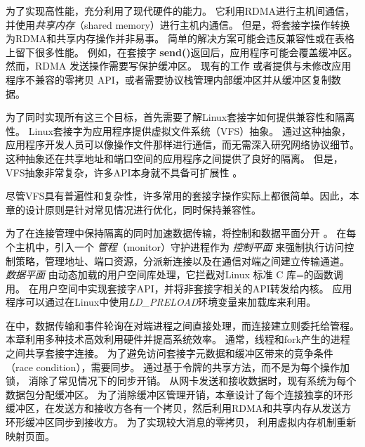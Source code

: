 为了实现高性能，\sys{}充分利用了现代硬件的能力。 它利用RDMA进行主机间通信，并使用\emph {共享内存}（shared memory）进行主机内通信。 但是，将套接字操作转换为RDMA和共享内存操作并非易事。
简单的解决方案可能会违反兼容性或在表格上留下很多性能。
例如，在套接字 \textbf {send()}返回后，应用程序可能会覆盖缓冲区。
然而，RDMA 发送操作需要写保护缓冲区。
现有的工作 \cite {rsockets} 或者提供与未修改应用程序不兼容的零拷贝 API，或者需要协议栈管理内部缓冲区并从缓冲区复制数据。

为了同时实现所有这三个目标，首先需要了解Linux套接字如何提供兼容性和隔离性。 Linux套接字为应用程序提供虚拟文件系统（VFS）抽象。 通过这种抽象，应用程序开发人员可以像操作文件那样进行通信，而无需深入研究网络协议细节。 这种抽象还在共享地址和端口空间的应用程序之间提供了良好的隔离。 但是，VFS抽象非常复杂，许多API本身就不具备可扩展性 \cite {clark1989analysis,boyd2010analysis,jeong2014mtcp}。

尽管VFS具有普遍性和复杂性，许多常用的套接字操作实际上都很简单。因此，本章的设计原则是针对常见情况进行优化，同时保持兼容性。

为了在连接管理中保持隔离的同时加速数据传输，\sys {}将控制和数据平面分开 \cite {peter2016arrakis}。
在每个主机中，引入一个 \emph {管程}（monitor）守护进程作为 \emph {控制平面} 来强制执行访问控制策略，管理地址、端口资源，分派新连接以及在通信对端之间建立传输通道。
\emph {数据平面} 由动态加载的用户空间库\libipc {}处理，它拦截对Linux 标准 C 库=的函数调用。 \libipc {}在用户空间中实现套接字API，并将非套接字相关的API转发给内核。
应用程序可以通过在Linux中使用\emph {LD\_PRELOAD}环境变量来加载库来利用\libipc {}。


在\sys {}中，数据传输和事件轮询在对端进程之间直接处理，而连接建立则委托给管程。
本章利用多种技术高效利用硬件并提高系统效率。
通常，线程和fork产生的进程之间共享套接字连接。
为了避免访问套接字元数据和缓冲区带来的竞争条件（race condition），需要同步。
通过基于令牌的共享方法，而不是为每个操作加锁，\sys{} 消除了常见情况下的同步开销。
从网卡发送和接收数据时，现有系统为每个数据包分配缓冲区。
为了消除缓冲区管理开销，本章设计了每个连接独享的环形缓冲区，在发送方和接收方各有一个拷贝，然后利用RDMA和共享内存从发送方环形缓冲区同步到接收方。
为了实现较大消息的零拷贝，\sys{} 利用虚拟内存机制重新映射页面。


